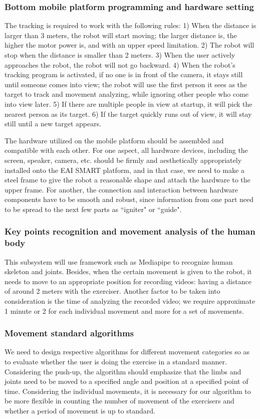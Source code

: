 \subsubsection{Bottom mobile platform programming and hardware setting}
The tracking is required to work with the following rules: 1) When the distance is larger than 3 meters, the robot will start moving; the larger distance is, the higher the motor power is, and with an upper speed limitation. 2) The robot will stop when the distance is smaller than 2 meters. 3) When the user actively approaches the robot, the robot will not go backward. 4) When the robot’s tracking program is activated, if no one is in front of the camera, it stays still until someone comes into view; the robot will use the first person it sees as the target to track and movement analyzing, while ignoring other people who come into view later. 5) If there are multiple people in view at startup, it will pick the nearest person as its target. 6) If the target quickly runs out of view, it will stay still until a new target appears.

The hardware utilized on the mobile platform should be assembled and compatible with each other. For one aspect, all hardware devices, including the screen, speaker, camera, etc. should be firmly and aesthetically appropriately installed onto the EAI SMART platform, and in that case, we need to make a steel frame to give the robot a reasonable shape and attach the hardware to the upper frame. For another, the connection and interaction between hardware components have to be smooth and robust, since information from one part need to be spread to the next few parts as ``igniter" or ``guide".
\subsubsection{Key points recognition and movement analysis of the human body}
This subsystem will use framework such as Mediapipe to recognize human skeleton and joints. Besides, when the certain movement is given to the robot, it needs to move to an appropriate position for recording videos: having a distance of around 2 meters with the exerciser. Another factor to be taken into consideration is the time of analyzing the recorded video; we require approximate 1 minute or 2 for each individual movement and more for a set of movements.
\subsubsection{Movement standard algorithms}
We need to design respective algorithms for different movement categories so as to evaluate whether the user is doing the exercise in a standard manner. Considering the push-up, the algorithm should emphasize that the limbs and joints need to be moved to a specified angle and position at a specified point of time. Considering the individual movements, it is necessary for our algorithm to be more flexible in counting the number of movement of the exercisers and whether a period of movement is up to standard.
